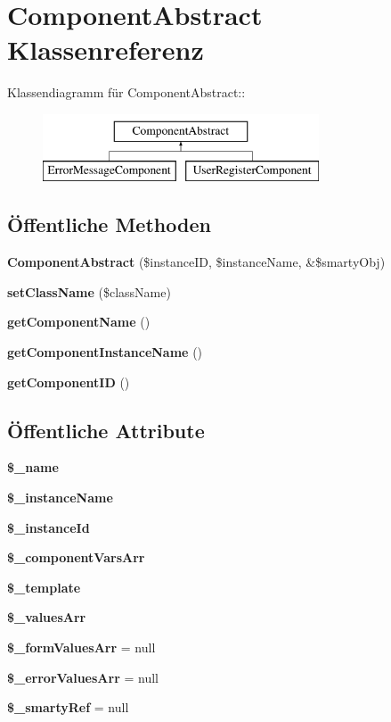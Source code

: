 \section{ComponentAbstract Klassenreferenz}
\label{classComponentAbstract}
Klassendiagramm für ComponentAbstract::\begin{figure}[H]
\begin{center}
\leavevmode
\includegraphics[height=2cm]{classComponentAbstract}
\end{center}
\end{figure}
\subsection*{Öffentliche Methoden}
\begin{CompactItemize}
\item 
{\bf ComponentAbstract} (\$instanceID, \$instanceName, \&\$smartyObj)
\item 
{\bf setClassName} (\$className)
\item 
{\bf getComponentName} ()
\item 
{\bf getComponentInstanceName} ()
\item 
{\bf getComponentID} ()
\end{CompactItemize}
\subsection*{Öffentliche Attribute}
\begin{CompactItemize}
\item 
{\bf \$\_\-name}
\item 
{\bf \$\_\-instanceName}
\item 
{\bf \$\_\-instanceId}
\item 
{\bf \$\_\-componentVarsArr}
\item 
{\bf \$\_\-template}
\item 
{\bf \$\_\-valuesArr}
\item 
{\bf \$\_\-formValuesArr} = null
\item 
{\bf \$\_\-errorValuesArr} = null
\item 
{\bf \$\_\-smartyRef} = null
\end{CompactItemize}


